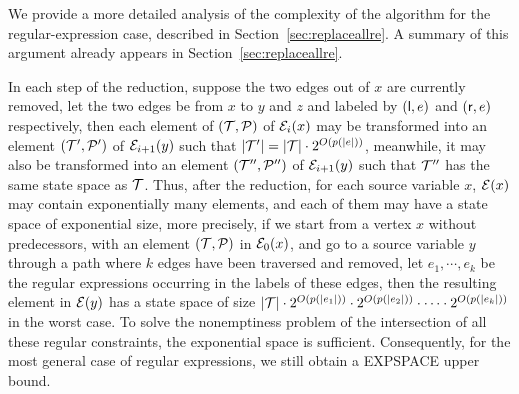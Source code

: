 We provide a more detailed analysis of the complexity of the algorithm for the regular-expression case, described in Section~\ref{sec:replaceallre}.
A summary of this argument already appears in Section~\ref{sec:replaceallre}.

In each step of the reduction, suppose the two edges out of $x$ are currently removed, let the two edges be from $x$ to $y$ and $z$ and labeled by $({\sf l}, e)$ and $({\sf r}, e)$ respectively, then each element of $(\mathcal{T}, \mathcal{P})$ of $\mathcal{E}_i(x)$ may be transformed into an element $(\mathcal{T}',\mathcal{P}')$ of $\mathcal{E}_{i+1}(y)$ such that $|\mathcal{T}'| = |\mathcal{T}| \cdot 2^{O(p(|e|))}$, meanwhile, it may also be transformed into an element $(\mathcal{T}'',\mathcal{P}'')$ of $\mathcal{E}_{i+1}(y)$ such that $\mathcal{T}''$ has the same state space as $\mathcal{T}$. Thus, after the reduction, for each source variable $x$, $\mathcal{E}(x)$ may contain exponentially many elements, and each of them may have a state space of exponential size, more precisely, if we start from a vertex $x$ without predecessors, with an element $(\mathcal{T},\mathcal{P})$ in $\mathcal{E}_0(x)$, and go to a source variable $y$ through a path where $k$ edges have been traversed and removed, let $e_1,\cdots, e_k$ be the regular expressions occurring in the labels of these edges, then the resulting element in $\mathcal{E}(y)$ has a state space of size $|\mathcal{T}| \cdot 2^{O(p(|e_1|))} \cdot 2^{O(p(|e_2|))} \cdot \cdots \cdot 2^{O(p(|e_k|))}$ in the worst case. To solve the nonemptiness problem of the intersection of all these regular constraints, the exponential space is sufficient. Consequently, for the most general case of regular expressions, we still obtain a EXPSPACE upper bound. 

